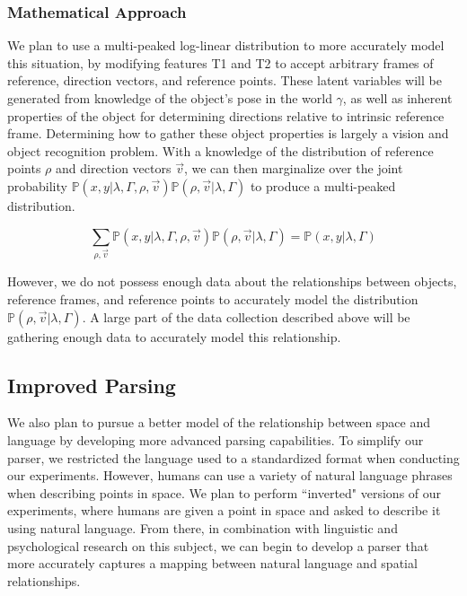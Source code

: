 \documentclass[12pt,letterpaper]{article}
\newcommand\prob{\mathbb{P}}
\begin{document}
\subsubsection{Mathematical Approach}

We plan to use a multi-peaked log-linear distribution to more accurately model this situation, by modifying features T1 and T2 to accept arbitrary frames of reference, direction vectors, and reference points. These latent variables will be generated from knowledge of the object's pose in the world $\gamma$, as well as inherent properties of the object for determining directions relative to intrinsic reference frame. Determining how to gather these object properties is largely a vision and object recognition problem. With a knowledge of the distribution of reference points $\rho$ and direction vectors $\vec{v}$, we can then marginalize over the joint probability $\prob(x, y | \lambda,\Gamma, \rho, \vec{v} )\prob(\rho, \vec{v} | \lambda, \Gamma)$ to produce a multi-peaked distribution. 

\[
\sum_{\rho, \vec{v}} \prob(x, y | \lambda,\Gamma, \rho, \vec{v} )\prob(\rho, \vec{v} | \lambda, \Gamma) = \prob(x, y | \lambda, \Gamma)
\]

However, we do not possess enough data about the relationships between objects, reference frames, and reference points to accurately model the distribution $\prob(\rho, \vec{v} | \lambda, \Gamma)$. A large part of the data collection described above will be gathering enough data to accurately model this relationship. 

\subsection{Improved Parsing}

We also plan to pursue a better model of the relationship between space and language by developing more advanced parsing capabilities. To simplify our parser, we restricted the language used to a standardized format when conducting our experiments. However, humans can use a variety of natural language phrases when describing points in space. We plan to perform ``inverted" versions of our experiments, where humans are given a point in space and asked to describe it using natural language. From there, in combination with linguistic and psychological research on this subject, we can begin to develop a parser that more accurately captures a mapping between natural language and spatial relationships. 
\end{document}
